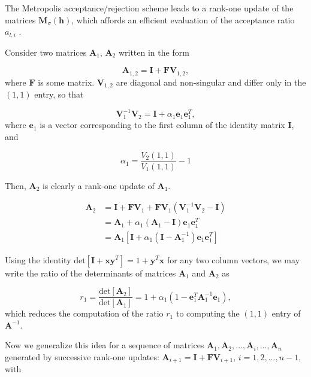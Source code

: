 The Metropolis acceptance/rejection scheme leads to a rank-one update of the matrices $\bm M_\sigma (\bm h)$, which affords an efficient evaluation of the acceptance ratio $a_{l, i}$ \cite{Bai2006}.

Consider two matrices $\bm A_1$, $\bm A_2$ written in the form

\begin{equation}
\bm A_{1,2} = \bm I + \bm F \bm V_{1,2} ,
\end{equation}
where $\bm F$ is some matrix. $\bm V_{1,2}$ are diagonal and non-singular and differ only in the $(1,1)$ entry, so that

\begin{equation}
\bm V_1^{-1} \bm V_2 = \bm I + \alpha_1 \bm e_1 \bm e_1^T ,
\end{equation}
where $\bm e_1$ is a vector corresponding to the first column of the identity matrix $\bm I$, and

\begin{equation*}
\alpha_1 = \frac{V_2(1,1)}{V_1(1,1)} - 1
\end{equation*}

Then, $\bm A_2$ is clearly a rank-one update of $\bm A_1$.

\begin{equation*}
\begin{split}
\bm A_2 &= \bm I + \bm F \bm V_1 + \bm F \bm V_1 ( \bm V_1^{-1} \bm V_2 - \bm I ) \\
&= \bm A_1 + \alpha_1 ( \bm A_1 - \bm I ) \bm e_1 \bm e_1^T \\
&= \bm A_1 [ \bm I + \alpha_1 ( \bm I - \bm A_1^{-1} )\bm e_1 \bm e_1^T ]
\end{split}
\end{equation*}

Using the identity $\text{det}[\bm I + \bm x \bm y^T] = 1 + \bm y^T \bm x$ for any two column vectors, we may write the ratio of the determinants of matrices $\bm A_1$ and $\bm A_2$ as

\begin{equation}\label{eq:efRatio}
r_1 = \frac{\text{det}[\bm A_2]}{\text{det}[\bm A_1]} = 1 + \alpha_1 ( 1 - \bm e_1^T \bm A_1^{-1} \bm e_1 ) ,
\end{equation}
which reduces the computation of the ratio $r_1$ to computing the $(1,1)$ entry of $\bm A^{-1}$.

Now we generalize this idea for a sequence of matrices $\bm A_1, \bm A_2, ..., \bm A_i, ..., \bm A_n$ generated by successive rank-one updates: $\bm A_{i+1} = \bm I + \bm F \bm V_{i+1}, \, i = 1, 2, ..., n-1$, with

